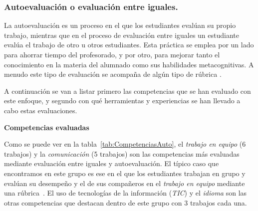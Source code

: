 \subsubsection{Autoevaluación o evaluación entre iguales.}

La autoevaluación es un proceso en el que los estudiantes evalúan su propio trabajo, mientras que  en el proceso de evaluación entre iguales un estudiante evalúa el trabajo de otro u otros estudiantes. Esta práctica se emplea por un lado para ahorrar tiempo del profesorado, y por otro, para mejorar tanto el conocimiento en la materia del alumnado como sus habilidades metacognitivas. A menudo este tipo de evaluación se acompaña de algún tipo de rúbrica \cite{malehorn1994ten}.

A continuación se van a listar primero las competencias que se han evaluado con este enfoque, y segundo con qué herramientas y experiencias se han llevado a cabo estas evaluaciones.

\bigskip
\textbf{Competencias evaluadas}
\bigskip

Como se puede ver en la tabla~\ref{tab:CompetenciasAuto}, el \emph{trabajo en equipo} (6 trabajos) y la \emph{comunicación} (5 trabajos) son las competencias más evaluadas mediante evaluación entre iguales y autoevaluación. El típico caso que encontramos en este grupo es ese en el que los estudiantes trabajan en grupo y evalúan su desempeño y el de sus compañeros en el \emph{trabajo en equipo} mediante una rúbrica~\cite{ficapal2015learning}.
El uso de tecnologías de la información (\emph{TIC}) y el \emph{idioma} son las otras competencias que destacan dentro de este grupo con 3 trabajos cada una. 

